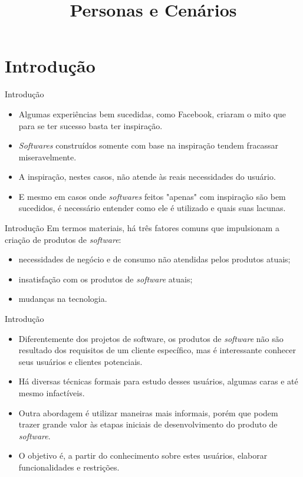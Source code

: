 \documentclass[11pt]{beamer}
\title{Personas e Cenários}
\author{}}
\date{}
\begin{document}
   \begin{frame}[plain]
        \titlepage
   \end{frame}

   \section{Introdução}

   \begin{frame}{Introdução}
      \begin{itemize}
         \item Algumas experiências bem sucedidas, como Facebook, criaram o mito que para se ter sucesso basta ter inspiração.
         \item \textit{Softwares} construídos somente com base na inspiração tendem fracassar miseravelmente.
         \item A inspiração, nestes casos, não atende às reais necessidades do usuário.
         \item E mesmo em casos onde \textit{softwares} feitos "apenas" com inspiração são bem sucedidos, é necessário entender como ele é utilizado e quais suas lacunas.
      \end{itemize}
   \end{frame}

   \begin{frame}{Introdução}
      Em termos materiais, há três fatores comuns que impulsionam a criação de produtos de \textit{software}:
      \begin{itemize}
         \item necessidades de negócio e de consumo não atendidas pelos produtos atuais;
         \item insatisfação com os produtos de \textit{software} atuais;
         \item mudanças na tecnologia.
       \end{itemize}
   \end{frame}

   \begin{frame}{Introdução}
      \begin{itemize}
         \item Diferentemente dos projetos de software, os produtos de \textit{software} não são resultado dos requisitos de um cliente específico, mas é interessante conhecer seus usuários e clientes potenciais.
         \item Há diversas técnicas formais para estudo desses usuários, algumas caras e até mesmo infactíveis.
         \item Outra abordagem é utilizar maneiras mais informais, porém que podem trazer grande valor às etapas iniciais de desenvolvimento do produto de \textit{software}.
         \item O objetivo é, a partir do conhecimento sobre estes usuários, elaborar funcionalidades e restrições.
      \end{itemize}
   \end{frame}
\end{document}
